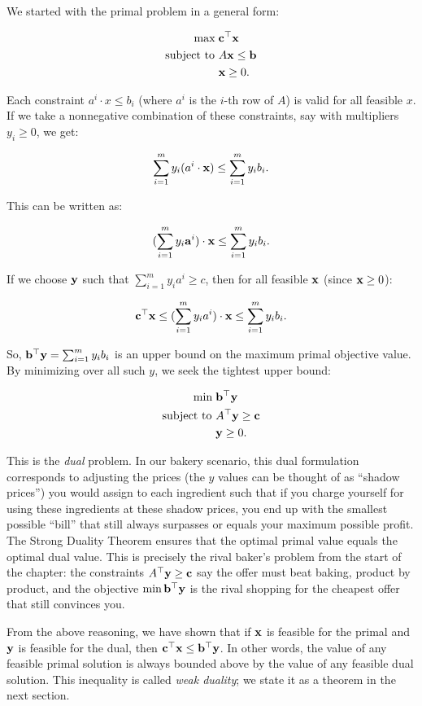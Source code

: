 We started with the primal problem in a general form:

\[
\begin{aligned}
\max \; & \mathbf{c}^\top \mathbf{x} \\
\text{subject to } & A\mathbf{x} \leq \mathbf{b} \\
& \mathbf{x} \geq 0.
\end{aligned}
\]

Each constraint $a^i \cdot x \leq b_i$ (where $a^i$ is the $i$-th row of $A$) is valid for all feasible $x$. If we take a nonnegative combination of these constraints, say with multipliers $y_i \geq 0$, we get:

\[
\sum_{i=1}^m y_i (a^i \cdot \mathbf{x}) \leq \sum_{i=1}^m y_i b_i.
\]

This can be written as:

\[
(\sum_{i=1}^m y_i \mathbf{a}^i) \cdot \mathbf{x} \leq \sum_{i=1}^m y_i b_i.
\]

If we choose $\mathbf{y}$ such that $\sum_{i=1}^m y_i a^i \geq c$, then for all feasible $\mathbf{x}$ (since $\mathbf{x} \geq 0$):

\[
\mathbf{c}^\top \mathbf{x} \leq (\sum_{i=1}^m y_i a^i)\cdot \mathbf{x} \leq \sum_{i=1}^m y_i b_i.
\]

So, $\mathbf{b}^\top \mathbf{y} = \sum_{i=1}^m y_i b_i$ is an upper bound on the maximum primal objective value. By minimizing over all such $y$, we seek the tightest upper bound:

\[
\begin{aligned}
\min \; & \mathbf{b}^\top \mathbf{y} \\
\text{subject to } & A^\top \mathbf{y} \geq \mathbf{c} \\
& \mathbf{y} \geq 0.
\end{aligned}
\]

This is the \emph{dual} problem. In our bakery scenario, this dual formulation corresponds to adjusting the prices (the $y$ values can be thought of as ``shadow prices'') you would assign to each ingredient such that if you charge yourself for using these ingredients at these shadow prices, you end up with the smallest possible ``bill'' that still always surpasses or equals your maximum possible profit. The Strong Duality Theorem ensures that the optimal primal value equals the optimal dual value. This is precisely the rival baker's problem from the start of the chapter: the constraints $A^\top \mathbf{y} \geq \mathbf{c}$ say the offer must beat baking, product by product, and the objective $\min \mathbf{b}^\top \mathbf{y}$ is the rival shopping for the cheapest offer that still convinces you.

From the above reasoning, we have shown that if $\mathbf{x}$ is feasible for the primal and $\mathbf{y}$ is feasible for the dual, then $\mathbf{c}^\top \mathbf{x} \leq \mathbf{b}^\top \mathbf{y}$. In other words, the value of any feasible primal solution is always bounded above by the value of any feasible dual solution. This inequality is called \emph{weak duality}; we state it as a theorem in the next section.

